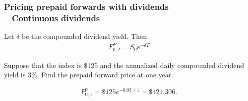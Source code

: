 \begin{frame}[fragile,t]
	\frametitle{Pricing prepaid forwards with dividends \\ -- Continuous dividends}
	Let $\delta$ be the compounded dividend yield. Then
	\begin{align*}
		F_{0,T}^P = S_0 e^{-\delta T}
	\end{align*}
\end{frame}
\begin{frame}[fragile,t]
\begin{myexample}
 Suppose that the index is $\$125$ and the annualized daily compounded dividend yield is $3\%$. Find
 the prepaid forward price at one year.
\end{myexample}
\pause
\bigskip
\begin{mysol}
	\begin{align*}
		F_{0,1}^p = \$125 e^{-0.03 \times 1} = \$121.306.
	\end{align*}
	\myEnd
\end{mysol}
\end{frame}
